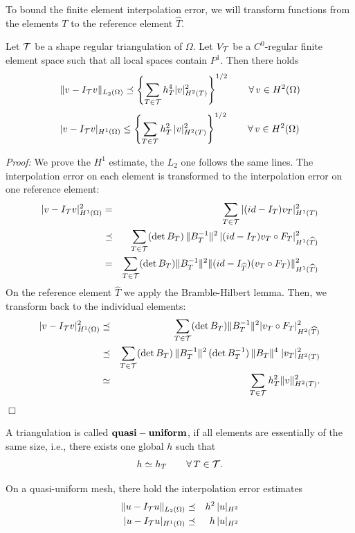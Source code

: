 To bound the finite element interpolation error, we will transform
functions from the elements $T$ to the reference element $\widehat T$.

\begin{theorem} Let ${\cal T}$ be a shape regular triangulation of $\Omega$.
Let $V_{\cal T}$ be a $C^0$-regular finite element space such that all local spaces contain $P^1$. Then there holds
$$
\| v - I_{\cal T} v \|_{L_2(\Omega)} \preceq  \left\{ \sum_{T \in {\cal T}} h_T^4 | v |_{H^2(T)}^2 \right\}^{1/2} \qquad \forall \, v \in H^2(\Omega)
$$
$$
| v - I_{\cal T} v |_{H^1(\Omega)} \leq 
\left\{ \sum_{T \in {\cal T}} h_T^2  \, | v |_{H^2(T)}^2 \right\}^{1/2} \qquad \forall \, v \in H^2(\Omega)
$$
\end{theorem}

{\em Proof:} We prove the $H^1$ estimate, the $L_2$ one follows the same lines. The interpolation error on each element is transformed to the interpolation error on one reference element:
\begin{eqnarray*}
| v - I_{\cal T} v |_{H^1(\Omega)}^2 & = & 
        \sum_{T \in {\cal T}} | (id - I_T) v_T |_{H^1(T)}^2 \\
        & \preceq & \sum_{T \in {\cal T}} (\det B_T) \, \| B_T^{-1} \|^2 \, | (id - I_T) v_T \circ F_T |_{H^1(\widehat T)}^2  \\
        & = & \sum_{T \in {\cal T}} (\det B_T) \| B_T^{-1}  \|^2 \| (id - I_{\widehat T}) (v_T \circ F_T) \| _{H^1 (\widehat T)}^2
\end{eqnarray*}
On the reference element $\widehat T$ we apply the Bramble-Hilbert lemma.
Then, we transform back to the individual elements:
\begin{eqnarray*}
| v - I_{\cal T} v |_{H^1(\Omega)}^2 & \preceq & 
        \sum_{T \in {\cal T}} (\det B_T) \| B_T^{-1}  \|^2 | v_T \circ F_T | _{H^2 (\widehat T)}^2 \\
  & \preceq &  \sum_{T \in {\cal T}} (\det B_T) \, \| B_T^{-1} \|^2 \, (\det B_T^{-1}) \, \| B_T \|^4  \; | v_T |_{H^2 (T)}^2 \\
        & \simeq & \sum_{T \in {\cal T}} h_T^2 \| v \|_{H^2 (T)}^2.
\end{eqnarray*}
\hfill $\Box$


\bigskip

A triangulation is called ${\bf quasi-uniform}$, if all elements are essentially of the
same size, i.e., there exists one global $h$ such that
$$
h \simeq h_T \qquad \forall \, T \in {\cal T}.
$$


On a quasi-uniform mesh, there hold the interpolation error estimates
\begin{eqnarray*}
\| u - I_{\cal T} u \|_{L_2(\Omega)} & \preceq & h^2 \, | u |_{H^2} \\
| u - I_{\cal T} u |_{H^1(\Omega)} & \preceq & h \, | u |_{H^2} 
\end{eqnarray*}


